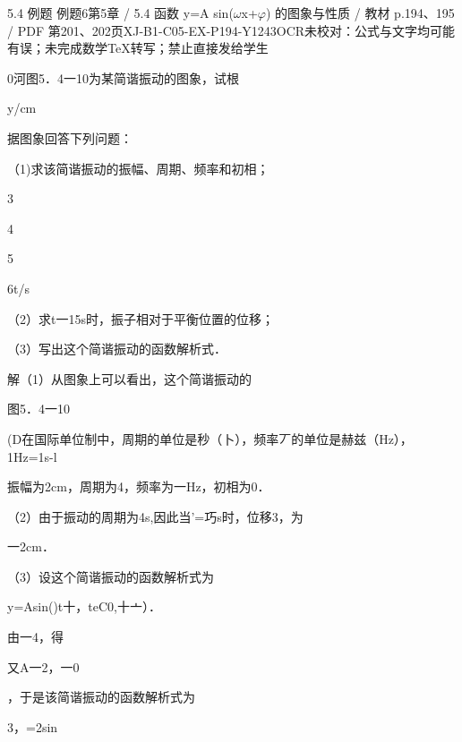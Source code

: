 \begin{bankitem}{5.4 例题 例题6}{第5章 / 5.4 函数 y=A sin(\ensuremath{\omega}x+\ensuremath{\varphi}) 的图象与性质 / 教材 p.194、195 / PDF 第201、202页}{XJ-B1-C05-EX-P194-Y1243}{OCR未校对：公式与文字均可能有误；未完成数学TeX转写；禁止直接发给学生}
\begin{ocrdraft}
\par
0河图5．4一10为某简谐振动的图象，试根
\par
y/cm
\par
据图象回答下列问题：
\par
（1)求该简谐振动的振幅、周期、频率和初相；
\par
3
\par
4
\par
5
\par
6t/s
\par
（2）求t一15s时，振子相对于平衡位置的位移；
\par
（3）写出这个简谐振动的函数解析式．
\par
解（1）从图象上可以看出，这个简谐振动的
\par
图5．4一10
\par
(D在国际单位制中，周期的单位是秒（卜），频率丆的单位是赫兹（Hz），1Hz=1s-l
\par
[教材p.195 / PDF第202页]
\par
振幅为2cm，周期为4，频率为一Hz，初相为0．
\par
（2）由于振动的周期为4s,因此当'=巧s时，位移3，为
\par
一2cm．
\par
（3）设这个简谐振动的函数解析式为
\par
y=Asin()t十，teC0,十亠）．
\par
由一4，得
\par
又A一2，一0
\par
，于是该简谐振动的函数解析式为
\par
3，=2sin
\end{ocrdraft}
\end{bankitem}
